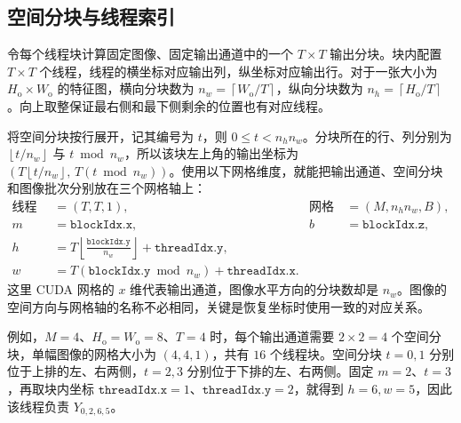 \subsection{空间分块与线程索引}
\label{l11:subsec:grid_mapping}

令每个线程块计算固定图像、固定输出通道中的一个 $T\times T$ 输出分块。块内配置 $T\times T$ 个线程，线程的横坐标对应输出列，纵坐标对应输出行。对于一张大小为 $H_{\mathrm{o}}\times W_{\mathrm{o}}$ 的特征图，横向分块数为 $n_w=\left\lceil W_{\mathrm{o}}/T\right\rceil$，纵向分块数为 $n_h=\left\lceil H_{\mathrm{o}}/T\right\rceil$。向上取整保证最右侧和最下侧剩余的位置也有对应线程。

将空间分块按行展开，记其编号为 $t$，则 $0\le t<n_hn_w$。分块所在的行、列分别为 $\left\lfloor t/n_w\right\rfloor$ 与 $t\bmod n_w$，所以该块左上角的输出坐标为 $(T\left\lfloor t/n_w\right\rfloor,\,T(t\bmod n_w))$。使用以下网格维度，就能把输出通道、空间分块和图像批次分别放在三个网格轴上：
\begin{equation}
\begin{aligned}
  \text{线程块维度}&=(T,T,1),&
  \text{网格维度}&=(M,n_hn_w,B),\\
  m&=\texttt{blockIdx.x},&
  b&=\texttt{blockIdx.z},\\
  h&=T\left\lfloor \frac{\texttt{blockIdx.y}}{n_w}\right\rfloor
      +\texttt{threadIdx.y},\\
  w&=T(\texttt{blockIdx.y}\bmod n_w)
      +\texttt{threadIdx.x}.
\end{aligned}
\label{l11:eq:grid_mapping}
\end{equation}
这里 CUDA 网格的 $x$ 维代表输出通道，图像水平方向的分块数却是 $n_w$。图像的空间方向与网格轴的名称不必相同，关键是恢复坐标时使用一致的对应关系。

例如，$M=4$、$H_{\mathrm{o}}=W_{\mathrm{o}}=8$、$T=4$ 时，每个输出通道需要 $2\times2=4$ 个空间分块，单幅图像的网格大小为 $(4,4,1)$，共有 $16$ 个线程块。空间分块 $t=0,1$ 分别位于上排的左、右两侧，$t=2,3$ 分别位于下排的左、右两侧。固定 $m=2$、$t=3$，再取块内坐标 $\texttt{threadIdx.x}=1$、$\texttt{threadIdx.y}=2$，就得到 $h=6,w=5$，因此该线程负责 $Y_{0,2,6,5}$。

